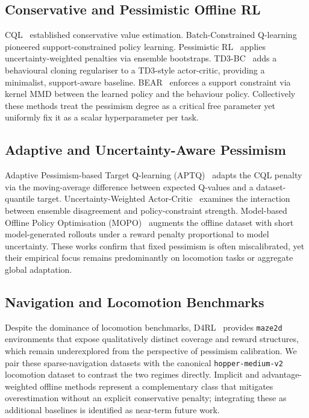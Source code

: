 \documentclass[conference]{IEEEtran}
\begin{document}
\subsection{Conservative and Pessimistic Offline RL}

CQL~\cite{kumar2020conservative} established conservative value estimation.
Batch-Constrained Q-learning~\cite{fujimoto2019bcq} pioneered
support-constrained policy learning. Pessimistic
RL~\cite{an2021pbrl} applies uncertainty-weighted penalties via
ensemble bootstraps. TD3-BC~\cite{fujimoto2021td3bc} adds a behavioural
cloning regulariser to a TD3-style actor-critic, providing a minimalist,
support-aware baseline. BEAR~\cite{kumar2019bear} enforces a support
constraint via kernel MMD between the learned policy and the behaviour
policy. Collectively these methods treat the pessimism degree as a critical
free parameter yet uniformly fix it as a scalar hyperparameter per task.

\subsection{Adaptive and Uncertainty-Aware Pessimism}

Adaptive Pessimism-based Target Q-learning
(APTQ)~\cite{liu2023aptq} adapts the CQL penalty via the moving-average
difference between expected Q-values and a dataset-quantile target.
Uncertainty-Weighted Actor-Critic~\cite{wu2021uncertainty} examines the
interaction between ensemble disagreement and policy-constraint strength.
Model-based Offline Policy Optimisation
(MOPO)~\cite{yu2020mopo} augments the offline dataset with short
model-generated rollouts under a reward penalty proportional to model
uncertainty. These works confirm that fixed pessimism is often
miscalibrated, yet their empirical focus remains predominantly on locomotion
tasks or aggregate global adaptation.

\subsection{Navigation and Locomotion Benchmarks}

Despite the dominance of locomotion benchmarks,
D4RL~\cite{fu2020d4rl} provides \texttt{maze2d} environments that expose
qualitatively distinct coverage and reward structures, which remain
underexplored from the perspective of pessimism calibration. We pair these
sparse-navigation datasets with the canonical \texttt{hopper-medium-v2}
locomotion dataset to contrast the two regimes directly. Implicit and
advantage-weighted offline methods represent a complementary class that
mitigates overestimation without an explicit conservative penalty;
integrating these as additional baselines is identified as near-term future
work.
\end{document}
